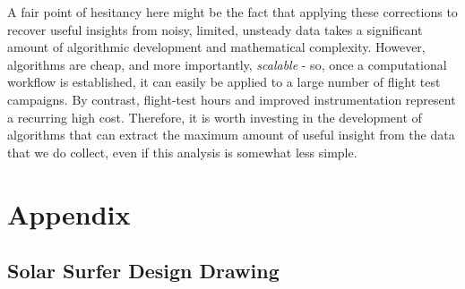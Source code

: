 \documentclass[conf]{new-aiaa}
\begin{document}
    A fair point of hesitancy here might be the fact that applying these corrections to recover useful insights from noisy, limited, unsteady data takes a significant amount of algorithmic development and mathematical complexity. However, algorithms are cheap, and more importantly, \emph{scalable} - so, once a computational workflow is established, it can easily be applied to a large number of flight test campaigns. By contrast, flight-test hours and improved instrumentation represent a recurring high cost. Therefore, it is worth investing in the development of algorithms that can extract the maximum amount of useful insight from the data that we do collect, even if this analysis is somewhat less simple.



    \newpage

    \section{Appendix}

    \subsection{Solar Surfer Design Drawing}
    \label{sec:solar_surfer_drawing}

    \begin{figure}[H]
        \centering
        \label{fig:solar_surfer_design}
    \end{figure}
\end{document}
